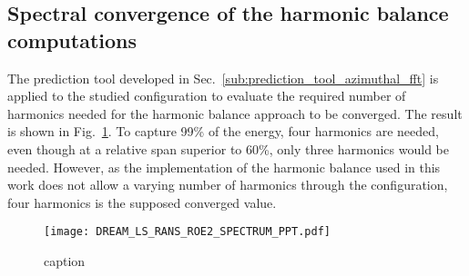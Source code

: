 
\subsection{Spectral convergence of the harmonic balance computations} 
\label{sub:dream_ls_hb_convergence}

The prediction tool developed in 
Sec.~\ref{sub:prediction_tool_azimuthal_fft} is applied
to the studied configuration to evaluate the
required number of harmonics needed for the
harmonic balance approach to be converged.
The result is shown in Fig.~\ref{fig:DREAM_LS_RANS_ROE2_SPECTRUM_PPT}.
To capture 99\% of the energy, four harmonics are needed, even though
at a relative span superior to 60\%, only three harmonics would be needed.
However, as the implementation of the harmonic balance used
in this work does not allow a varying number of harmonics through the
configuration, four harmonics is the supposed converged value.
\begin{figure}[htbp]
  \centering
  \texttt{[image: DREAM\_LS\_RANS\_ROE2\_SPECTRUM\_PPT.pdf]}
  \caption{caption}
  \label{fig:DREAM_LS_RANS_ROE2_SPECTRUM_PPT}
\end{figure}





